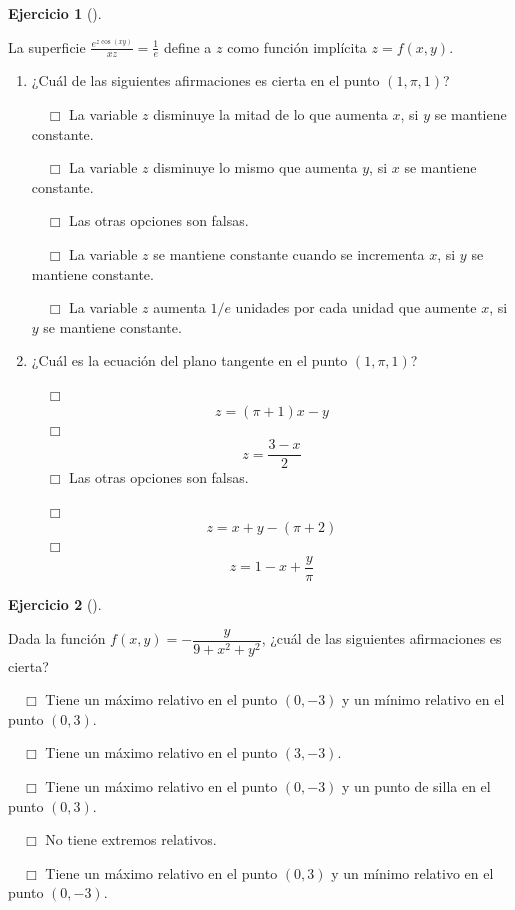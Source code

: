 \documentclass[
  a4paper,
]{scrreport}
\theoremstyle{definition}
\newtheorem{exercise}{Ejercicio}[chapter]
\theoremstyle{remark}
\begin{document}
\begin{exercise}[]\protect\hypertarget{exr-derivadas-funciones-varias-variables-propuesto-4}{}\label{exr-derivadas-funciones-varias-variables-propuesto-4}

La superficie \(\frac{e^{z\cos(xy)}}{xz}=\frac{1}{e}\) define a \(z\)
como función implícita \(z=f(x,y)\).

\begin{enumerate}
\def\labelenumi{\alph{enumi}.}
\item
  ¿Cuál de las siguientes afirmaciones es cierta en el punto
  \((1,\pi,1)\)?

  ${\quad\Box}$ La variable $z$ disminuye la mitad de lo que aumenta $x$, si $y$ se mantiene constante.

  ${\quad\Box}$ La variable $z$ disminuye lo mismo que aumenta $y$, si $x$ se mantiene constante.

  ${\quad\Box}$ Las otras opciones son falsas.

  ${\quad\Box}$ La variable $z$ se mantiene constante cuando se incrementa $x$, si $y$ se mantiene constante.

  ${\quad\Box}$ La variable $z$ aumenta $1/e$ unidades por cada unidad que aumente $x$, si $y$ se mantiene constante.
\item
  ¿Cuál es la ecuación del plano tangente en el punto \((1,\pi,1)\)?

  ${\quad\Box}$ $$z=(\pi+1)x-y$$
  ${\quad\Box}$ $$z=\frac{3-x}{2}$$
  ${\quad\Box}$ Las otras opciones son falsas.

  ${\quad\Box}$ $$z=x+y-(\pi+2)$$
  ${\quad\Box}$ $$z=1-x+\frac{y}{\pi}$$
\end{enumerate}

\end{exercise}

\begin{exercise}[]\protect\hypertarget{exr-derivadas-funciones-varias-variables-propuesto-5}{}\label{exr-derivadas-funciones-varias-variables-propuesto-5}

Dada la función \(f(x,y)=-\dfrac{y}{9+x^2+y^2}\), ¿cuál de las
siguientes afirmaciones es cierta?

${\quad\Box}$ Tiene un máximo relativo en el punto $(0,-3)$ y un mínimo relativo en el punto $(0,3)$.

${\quad\Box}$ Tiene un máximo relativo en el punto $(3,-3)$.

${\quad\Box}$ Tiene un máximo relativo en el punto $(0,-3)$ y un punto de silla en el punto $(0,3)$.

${\quad\Box}$ No tiene extremos relativos.

${\quad\Box}$ Tiene un máximo relativo en el punto $(0,3)$ y un mínimo relativo en el punto $(0,-3)$.

\end{exercise}
\end{document}
